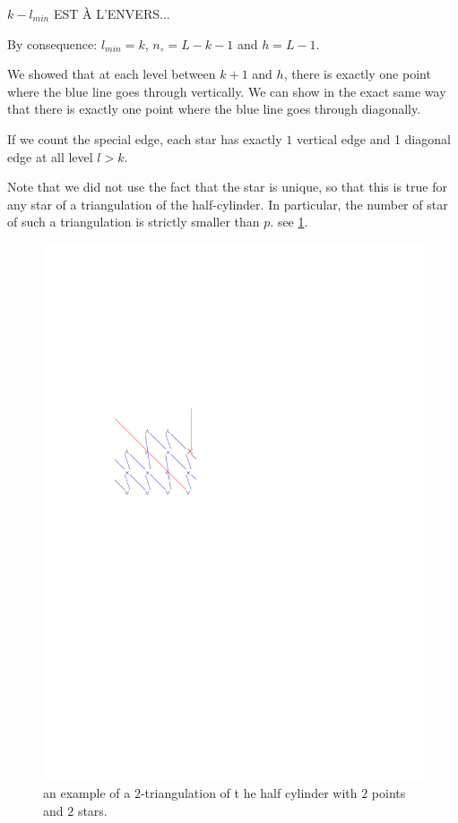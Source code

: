 \documentclass{amsart}
\theoremstyle{remark}
\begin{document}
$k-l_{min}$ EST À L'ENVERS...  

By consequence: $l_{min}=k$, $n_\circ=L-k-1$ and $h=L-1$.

We showed that at each level between $k+1$ and $h$, there is exactly one point where the blue line goes through vertically. We can show in the exact same way that there is exactly one point where the blue line goes through diagonally.

If we count the special edge, each star has exactly $1$ vertical edge and 1 diagonal edge at all level $l>k$.


Note that we did not use the fact that the star is unique, so that this is true for any star of a triangulation of the half-cylinder. In particular, the number of star of such a triangulation is strictly smaller than $p$. see \cref{fig:2stars}.


\begin{figure}\label{fig:2stars}
\includegraphics[width=.98\linewidth,page=3]{latticeRepresentation}
\caption{an example of a $2$-triangulation of t	he half cylinder with $2$ points and $2$ stars.}
\end{figure}
\end{document}
